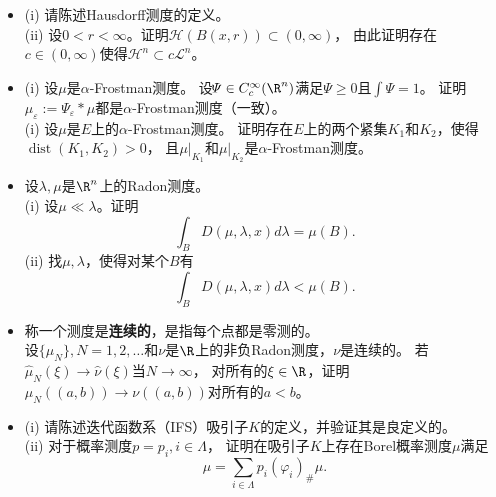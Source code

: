 \begin{itemize}
    \item[1.] (i) 请陈述Hausdorff测度的定义。\\
    (ii) 设$0<r<\infty$。证明$\mathcal{H}(B(x,r))\subset(0,\infty)$，
    由此证明存在$c\in(0,\infty)$使得$\mathcal{H}^n\subset c\mathscr{L}^n$。

    \item[2.] 
    (i) 设$\mu$是$\alpha$-Frostman测度。
    设$\!\varPsi\in C_c^\infty(\R^n)$满足$\!\varPsi\ge0$且$\int\!\varPsi=1$。
    证明$\mu_\varepsilon:=\!\varPsi_\varepsilon*\mu$都是$\alpha$-Frostman测度（一致）。\\
    (i)  设$\mu$是$E$上的$\alpha$-Frostman测度。
    证明存在$E$上的两个紧集$K_1$和$K_2$，使得$\operatorname{dist}(K_1,K_2)>0$，
    且$\mu|_{K_1}$和$\mu|_{K_2}$是$\alpha$-Frostman测度。

    \item[3.] 设$\lambda,\mu$是$\R^n$上的Radon测度。\\
    (i) 设$\mu\ll\lambda$。证明
    \[\int_B D(\mu,\lambda,x)d\lambda=\mu(B).\]
    (ii) 找$\mu,\lambda$，使得对某个$B$有
    \[\int_B D(\mu,\lambda,x)d\lambda<\mu(B).\]

    \item[4.] 称一个测度是\textbf{连续的}，是指每个点都是零测的。\\
    设$\{\mu_N\},N=1,2,\dots$和$\nu$是$\R$上的非负Radon测度，$\nu$是连续的。
    若$\widehat{\mu}_N(\xi)\to\widehat{\nu}(\xi)$当$N\to\infty$，
    对所有的$\xi\in\R$，证明$\mu_N((a,b))\to\nu((a,b))$对所有的$a<b$。

    \item[5.] (i) 请陈述迭代函数系（IFS）吸引子$K$的定义，并验证其是良定义的。\\
    (ii) 对于概率测度$p=p_i,i\in\Lambda$，
    证明在吸引子$K$上存在Borel概率测度$\mu$满足
    \[\mu=\sum_{i\in\Lambda}p_i(\varphi_i)_\#\mu.\]
\end{itemize}
